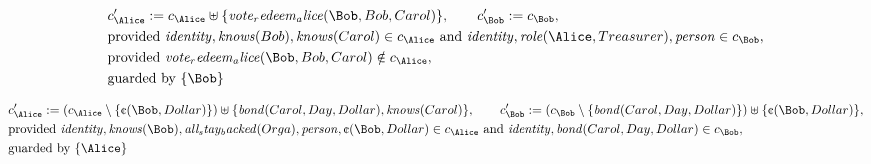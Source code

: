 \fi
\begin{align*}
&
c'_
{
\Alice
}
 := 
c_
{
\Alice
}
 \uplus 
\{
\mathit{
vote_redeem_alice
}
(
\Bob
,
Bob
,
Carol
)
\}
, \qquad 
c'_
{
\Bob
}
 := 
c_
{
\Bob
}
,\\
&
\text{provided } 
\mathit{
identity
}
,
\mathit{
knows
}
(
Bob
)
,
\mathit{
knows
}
(
Carol
)
 \in c_
{
\Alice
}
 \text{ and } 
\mathit{
identity
}
,
\mathit{
role
}
(
\Alice
,
Treasurer
)
,
\mathit{
person
}
 \in c_
{
\Bob
}
,\\
&
\text{provided } 
\mathit{
vote_redeem_alice
}
(
\Bob
,
Bob
,
Carol
)
 \notin c_
{
\Alice
}
,\\
&
\text{guarded by } \{
\Bob
\}
\end{align*}

\begin{align*}
&
c'_
{
\Alice
}
 := 
(c_
{
\Alice
}
 \setminus 
\{
\text{\textcent}
(
\Bob
,
Dollar
)
\}
) \uplus 
\{
\mathit{
bond
}
(
Carol
,
Day
,
Dollar
)
,
\mathit{
knows
}
(
Carol
)
\}
, \qquad 
c'_
{
\Bob
}
 := 
(c_
{
\Bob
}
 \setminus 
\{
\mathit{
bond
}
(
Carol
,
Day
,
Dollar
)
\}
) \uplus 
\{
\text{\textcent}
(
\Bob
,
Dollar
)
\}
,\\
&
\text{provided } 
\mathit{
identity
}
,
\mathit{
knows
}
(
\Bob
)
,
\mathit{
all_stay_backed
}
(
Orga
)
,
\mathit{
person
}
,
\text{\textcent}
(
\Bob
,
Dollar
)
 \in c_
{
\Alice
}
 \text{ and } 
\mathit{
identity
}
,
\mathit{
bond
}
(
Carol
,
Day
,
Dollar
)
 \in c_
{
\Bob
}
,\\
&
\text{guarded by } \{
\Alice
\}
\end{align*}


